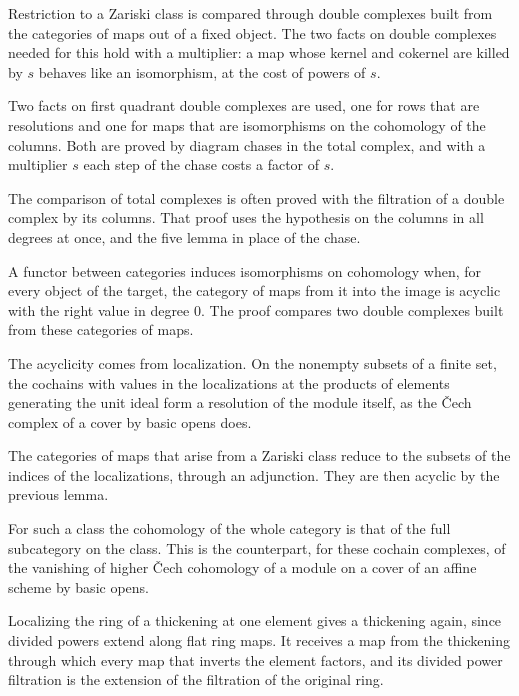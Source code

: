Restriction to a Zariski class is compared through double complexes built from the categories of maps out of a fixed
object. The two facts on double complexes needed for this hold with a multiplier: a map whose kernel and cokernel are
killed by $s$ behaves like an isomorphism, at the cost of powers of $s$.

Two facts on first quadrant double complexes are used, one for rows that are resolutions and one for maps that are
isomorphisms on the cohomology of the columns. Both are proved by diagram chases in the total complex, and with a
multiplier $s$ each step of the chase costs a factor of $s$.

The comparison of total complexes is often proved with the filtration of a double complex by its columns. That proof
uses the hypothesis on the columns in all degrees at once, and the five lemma in place of the chase.

A functor between categories induces isomorphisms on cohomology when, for every object of the target, the category of
maps from it into the image is acyclic with the right value in degree $0$. The proof compares two double complexes built
from these categories of maps.

The acyclicity comes from localization. On the nonempty subsets of a finite set, the cochains with values in the
localizations at the products of elements generating the unit ideal form a resolution of the module itself, as the
\v{C}ech complex of a cover by basic opens does.

The categories of maps that arise from a Zariski class reduce to the subsets of the indices of the localizations, through
an adjunction. They are then acyclic by the previous lemma.

For such a class the cohomology of the whole category is that of the full subcategory on the class. This is the
counterpart, for these cochain complexes, of the vanishing of higher \v{C}ech cohomology of a module on a cover of an
affine scheme by basic opens.

Localizing the ring of a thickening at one element gives a thickening again, since divided powers extend along flat ring
maps. It receives a map from the thickening through which every map that inverts the element factors, and its divided
power filtration is the extension of the filtration of the original ring.

